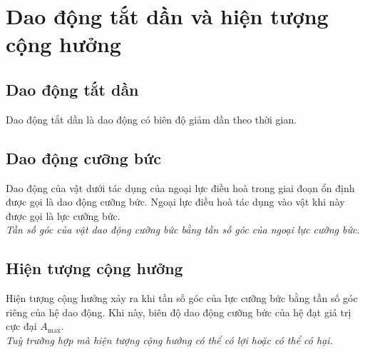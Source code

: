 \section{Dao động tắt dần và hiện tượng cộng hưởng}
\subsection{Dao động tắt dần}
Dao động tắt dần là dao động có biên độ giảm dần theo thời gian.
\subsection{Dao động cưỡng bức}
Dao động của vật dưới tác dụng của ngoại lực điều hoà trong giai đoạn ổn định được gọi là dao động cưỡng bức. Ngoại lực điều hoà tác dụng vào vật khi này được gọi là lực cưỡng bức.\\
\textit{Tần số góc của vật dao động cưỡng bức bằng tần số góc của ngoại lực cưỡng bức.}
\subsection{Hiện tượng cộng hưởng}
Hiện tượng cộng hưởng xảy ra khi tần số góc của lực cưỡng bức bằng tần số góc riêng của hệ dao động. Khi này, biên độ dao động cưỡng bức của hệ đạt giá trị cực đại $A_\text{max}$.\\
\textit{Tuỳ trường hợp mà hiện tượng cộng hưởng có thể có lợi hoặc có thể có hại.}